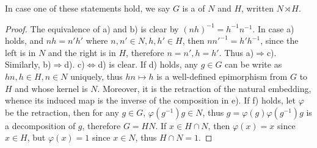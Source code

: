 In case one of these statements hold, we say $G$ is a  of $N$ and $H$, written $N\rtimes H$.
\begin{proof}
  The equivalence of a) and b) is clear by $(nh)^{-1}=h^{-1}n^{-1}$.
  In case a) holds, and $nh=n'h'$ where $n,n'\in N, h,h'\in H$, then $nn'^{-1}=h'h^{-1}$, since the left is in $N$ and the right is in $H$, therefore $n=n', h=h'$. Thus a)$\Rightarrow$c).
  Similarly, b)$\Rightarrow$d). c)$\Leftrightarrow$d) is clear.
  If d) holds, any $g\in G$ can be write as $hn, h\in H, n\in N$ uniquely, thus $hn\mapsto h$ is a well-defined epimorphism from $G$ to $H$ and whose kernel is $N$.
  Moreover, it is the retraction of the natural embedding, whence its induced map is the inverse of the composition in e).
  If f) holds, let $\varphi$ be the retraction, then for any $g\in G$, $\varphi(g^{-1})g\in N$, thus $g=\varphi(g)\varphi(g^{-1})g$ is a decomposition of $g$, therefore $G=HN$.
  If $x\in H\cap N$, then $\varphi(x)=x$ since $x\in H$, but $\varphi(x)=1$ since $x\in N$, thus $H\cap N=1$.
\end{proof}
